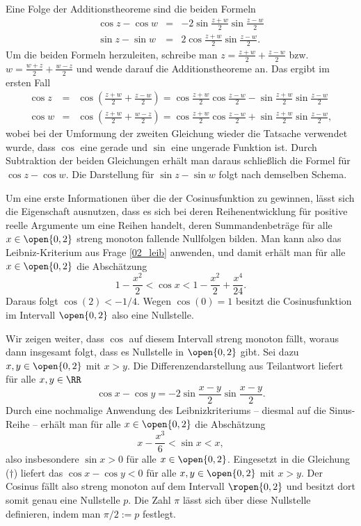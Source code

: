 \begin{antwort}
  \medskip
  \noindent
   Eine Folge der Additionstheoreme sind die beiden Formeln
  \[
  \boxed{
    \begin{array}{rcl}
      \cos z - \cos w &=& -2\sin \frac{z+w}{2} \sin\frac{z-w}{2} \\
      \sin z - \sin w &=& 2\cos \frac{z+w}{2} \sin\frac{z-w}{2}.
    \end{array}
  }
  \]
  Um die beiden Formeln herzuleiten, schreibe man 
  $z=\frac{z+w}{2}+\frac{z-w}{2}$ bzw. 
  $w=\frac{w+z}{2}+\frac{w-z}{2}$ und wende darauf die 
  Additionstheoreme an. Das ergibt im ersten Fall
  \[
  \begin{array}{rcl}
    \cos z &=& \cos( \frac{z+w}{2}+\frac{z-w}{2} ) =
    \cos \frac{z+w}{2} \cos \frac{z-w}{2} - \sin \frac{z+w}{2}\sin \frac{z-w}{2} \\
    \cos w &=& \cos( \frac{z+w}{2}+\frac{w-z}{2} ) =
    \cos \frac{z+w}{2} \cos\frac{z-w}{2} + \sin\frac{z+w}{2}\sin\frac{z-w}{2},
  \end{array}
  \]
  wobei bei der Umformung der zweiten Gleichung wieder die Tatsache 
  verwendet wurde, dass $\cos$ eine gerade und $\sin$ eine ungerade Funktion 
  ist. Durch Subtraktion der beiden Gleichungen erhält man daraus 
  schließlich die Formel für $\cos z-\cos w$. 
  Die Darstellung für $\sin z-\sin w$ folgt nach demselben Schema.

  \medskip\noindent
   Um eine erste Informationen über die 
   der Cosinusfunktion zu gewinnen, 
  lässt sich die Eigenschaft ausnutzen, dass es sich bei deren 
  Reihenentwicklung für positive reelle Argumente 
  um eine  Reihen handelt, 
  deren Summandenbeträge für alle $x\in\open{0,2}$ streng monoton fallende 
  Nullfolgen bilden. Man kann also das Leibniz-Kriterium aus Frage \ref{02_leib} 
  anwenden, und damit erhält man für alle $x\in \open{0,2}$ die Abschätzung
  \[
  1-\frac{x^2}{2} < \cos x < 1-\frac{x^2}{2}+\frac{x^4}{24} .
  \]
  Daraus folgt $\cos (2)<-1/4$. Wegen $\cos (0)=1$ besitzt 
  die Cosinusfunktion im Intervall $\open{0,2}$ also 
   eine Nullstelle. 

  Wir zeigen weiter, dass $\cos$ auf diesem Intervall streng monoton 
  fällt, woraus dann insgesamt folgt, dass es  
  Nullstelle in $\open{0,2}$ gibt. Sei dazu $x,y \in \open{0,2}$ mit $x>y$.   
  Die Differenzendarstellung aus Teilantwort  liefert 
  für alle $x,y\in\RR$ 
  \begin{equation}
    \cos x -\cos y =  -2\sin \frac{x-y}{2} \sin\frac{x-y}{2}. \tag{$\dagger$}  
  \end{equation}
  Durch eine nochmalige Anwendung des Leibnizkriteriums --  
  diesmal auf die Sinus-Reihe -- erhält man für alle $x\in\open{0,2}$ 
  die Abschätzung 
  \[
  x-\frac{x^3}{6} < \sin x  < x, 
  \]
  also insbesondere $\sin x>0$ für alle $x\in\open{0,2}$. Eingesetzt 
  in die Gleichung ($\dagger$) liefert das $\cos x-\cos y<0$ für 
  alle $x,y\in\open{0,2}$ mit $x>y$. Der Cosinus fällt also streng monoton 
  auf dem Intervall $\ropen{0,2}$ und besitzt dort somit genau eine 
  Nullstelle $p$. Die Zahl $\pi$ lässt sich über diese Nullstelle definieren, 
  indem man $\pi/2 := p$ festlegt.


\end{antwort}
